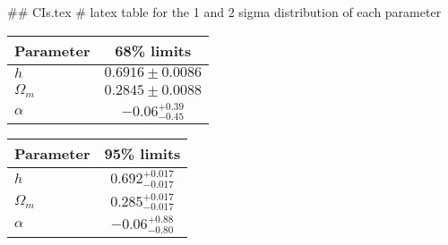 ## CIs.tex
# latex table for the 1 and 2 sigma distribution of each parameter

\begin{tabular} { l  c}
 Parameter &  68\% limits\\
\hline
{\boldmath$h              $} & $0.6916\pm 0.0086          $\\
{\boldmath$\Omega_m       $} & $0.2845\pm 0.0088          $\\
{\boldmath$\alpha         $} & $-0.06^{+0.39}_{-0.45}     $\\
\hline
\end{tabular}

\begin{tabular} { l  c}
 Parameter &  95\% limits\\
\hline
{\boldmath$h              $} & $0.692^{+0.017}_{-0.017}   $\\
{\boldmath$\Omega_m       $} & $0.285^{+0.017}_{-0.017}   $\\
{\boldmath$\alpha         $} & $-0.06^{+0.88}_{-0.80}     $\\
\hline
\end{tabular}
